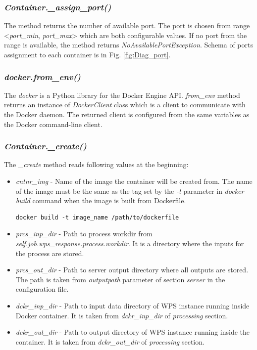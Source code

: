 \subsubsection{\textit{Container.\_assign\_port()}}
The method returns the number of available port. The port is chosen from range <\textit{port\_min},
\textit{port\_max}> which are both configurable values. If no port from the range is available, the method returns
\textit{NoAvailablePortException}. Schema of ports assignment to each container is in Fig. \ref{fig:Diag_port}.

\subsubsection{\textit{docker.from\_env()}} The \textit{docker} is a Python library for the Docker Engine API. \textit{from\_env} method
returns an instance of \textit{DockerClient} class which is a client to communicate with the Docker daemon. The returned client is
configured from the same variables as the Docker command-line client.

\subsubsection{\textit{Container.\_create()}} The \textit{\_create} method reads following values at the beginning:
\begin{itemize}
\item \textit{cntnr\_img} - Name of the image the container will be created from. The name of the image must be the same as the tag
set by the \textit{-t} parameter in \textit{docker build} command when the image is built from Dockerfile.

\bigskip
\begin{lstlisting}[basicstyle=\small,caption={Docker build command}]
docker build -t image_name /path/to/dockerfile
\end{lstlisting}

\item \textit{prcs\_inp\_dir} - Path to process workdir from \textit{self.job.wps\_response.process.workdir}. It is a directory where the
inputs for the process are stored.
\item \textit{prcs\_out\_dir} - Path to server output directory where all outputs are stored. The path is taken from \textit{outputpath}
parameter of section \textit{server} in the configuration file.
\item \textit{dckr\_inp\_dir} - Path to input data directory of WPS instance running inside Docker container. It is taken from 
\textit{dckr\_inp\_dir} of \textit{processing} section.
\item \textit{dckr\_out\_dir} - Path to output directory of WPS instance running inside the container. It is taken from 
\textit{dckr\_out\_dir} of \textit{processing} section.
\end{itemize}


